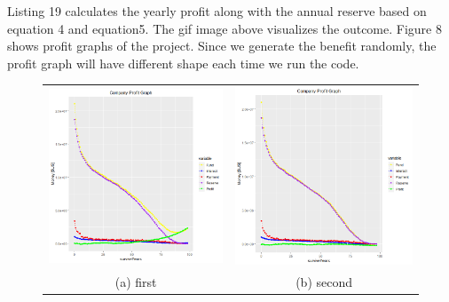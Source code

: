 \documentclass[12pt]{article}
\begin{document}

Listing 19 calculates the yearly profit along with the annual reserve based on equation 4 and equation5. The gif image above visualizes the outcome. Figure 8 shows profit graphs of the project. Since we generate the benefit randomly, the profit graph will have different shape each time we run the code.
\newpage
\begin{figure}[h]
	\begin{tabular}{cc}
		\includegraphics[width=65mm]{report_profit.PNG} &   \includegraphics[width=65mm]{profit1.PNG} \\
		(a) first & (b) second \\[6pt]

\end{tabular}
\end{figure}
\end{document}

